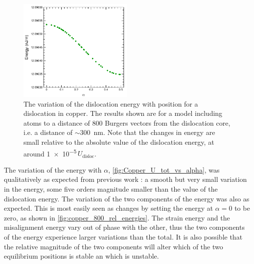 \begin{figure}
\centering
\includegraphics[width=0.5\textwidth]{Copper_800_U_tot}
\caption[Energy variation of a dislocation in copper with the dislocation position.]{The variation of the dislocation energy with position for a dislocation in copper. The results shown are for a model including atoms to a distance of 800 Burgers vectors from the dislocation core, i.e. a distance of $\sim$\SI{300}{\nano\metre}.  Note that the changes in energy are small relative to the absolute value of the dislocation energy, at around \num{1e-5}\,$U_{\text{disloc}}$.\label{fig:Copper_U_tot_vs_alpha}}
\end{figure}

The variation of the energy with $\alpha$, \autoref{fig:Copper_U_tot_vs_alpha}, was qualitatively as expected from previous work \cite{Bulatov1997,Clegg2006}: a smooth but very small variation in the energy, some five orders magnitude smaller than the value of the dislocation energy. The variation of the two components of the energy was also as expected. This is most easily seen as changes by setting the energy at $\alpha=0$ to be zero, as shown in \autoref{fig:copper_800_rel_energies}. The strain energy and the misalignment energy vary out of phase with the other, thus the two components of the energy experience larger variations than the total. It is also possible that the relative magnitude of the two components will alter which of the two equilibrium positions is stable an which is unstable.


